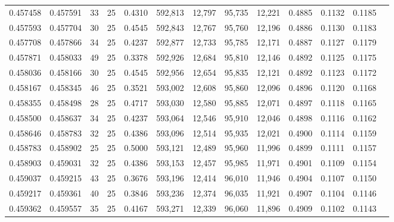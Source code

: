 \begin{tabular}{rrrrrrrrrrrrr}
0.457458 & 0.457591 &    33 &  25 &                                     0.4310 & 592,813 &  12,797 &  95,735 &  12,221 & 0.4885 & 0.1132 & 0.1185 \\
0.457593 & 0.457704 &    30 &  25 &                                     0.4545 & 592,843 &  12,767 &  95,760 &  12,196 & 0.4886 & 0.1130 & 0.1183 \\
0.457708 & 0.457866 &    34 &  25 &                                     0.4237 & 592,877 &  12,733 &  95,785 &  12,171 & 0.4887 & 0.1127 & 0.1179 \\
0.457871 & 0.458033 &    49 &  25 &                                     0.3378 & 592,926 &  12,684 &  95,810 &  12,146 & 0.4892 & 0.1125 & 0.1175 \\
0.458036 & 0.458166 &    30 &  25 &                                     0.4545 & 592,956 &  12,654 &  95,835 &  12,121 & 0.4892 & 0.1123 & 0.1172 \\
0.458167 & 0.458345 &    46 &  25 &                                     0.3521 & 593,002 &  12,608 &  95,860 &  12,096 & 0.4896 & 0.1120 & 0.1168 \\
0.458355 & 0.458498 &    28 &  25 &                                     0.4717 & 593,030 &  12,580 &  95,885 &  12,071 & 0.4897 & 0.1118 & 0.1165 \\
0.458500 & 0.458637 &    34 &  25 &                                     0.4237 & 593,064 &  12,546 &  95,910 &  12,046 & 0.4898 & 0.1116 & 0.1162 \\
0.458646 & 0.458783 &    32 &  25 &                                     0.4386 & 593,096 &  12,514 &  95,935 &  12,021 & 0.4900 & 0.1114 & 0.1159 \\
0.458783 & 0.458902 &    25 &  25 &                                     0.5000 & 593,121 &  12,489 &  95,960 &  11,996 & 0.4899 & 0.1111 & 0.1157 \\
0.458903 & 0.459031 &    32 &  25 &                                     0.4386 & 593,153 &  12,457 &  95,985 &  11,971 & 0.4901 & 0.1109 & 0.1154 \\
0.459037 & 0.459215 &    43 &  25 &                                     0.3676 & 593,196 &  12,414 &  96,010 &  11,946 & 0.4904 & 0.1107 & 0.1150 \\
0.459217 & 0.459361 &    40 &  25 &                                     0.3846 & 593,236 &  12,374 &  96,035 &  11,921 & 0.4907 & 0.1104 & 0.1146 \\
0.459362 & 0.459557 &    35 &  25 &                                     0.4167 & 593,271 &  12,339 &  96,060 &  11,896 & 0.4909 & 0.1102 & 0.1143 \\

\end{tabular}
